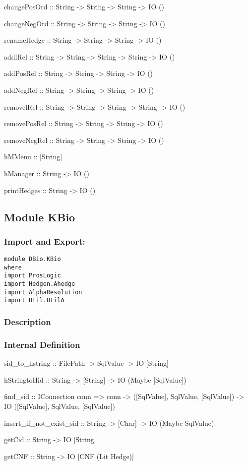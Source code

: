 \documentclass[../gr-final.tex]{subfiles}
\begin{document}
changePosOrd :: String -> String -> String -> IO ()

changeNegOrd :: String -> String -> String -> IO ()

renameHedge :: String -> String -> String -> IO ()

addlRel :: String -> String -> String -> String -> IO ()

addPosRel :: String -> String -> String -> IO ()

addNegRel :: String -> String -> String -> IO ()

removelRel :: String -> String -> String -> String -> IO ()

removePosRel :: String -> String -> String -> IO ()

removeNegRel :: String -> String -> String -> IO ()

hMMenu :: [String]

hManager :: String -> IO ()

printHedges :: String -> IO ()
\subsection{Module KBio}
\subsubsection{Import and Export:}
\begin{lstlisting}
module DBio.KBio 
where
import ProsLogic
import Hedgen.Ahedge
import AlphaResolution
import Util.UtilA
\end{lstlisting}
\subsubsection{Description}

\subsubsection{Internal Definition}
sid\_to\_hstring :: FilePath -> SqlValue -> IO [String]

hStringtoHid :: String -> [String] -> IO (Maybe [SqlValue])

find\_sid :: IConnection conn => conn -> ([SqlValue], SqlValue,
[SqlValue]) -> IO ([SqlValue], SqlValue, [SqlValue])

insert\_if\_not\_exist\_sid :: String -> [Char] -> IO (Maybe
SqlValue)

getCid :: String -> IO [String]

getCNF :: String -> IO [CNF (Lit Hedge)]
\end{document}
